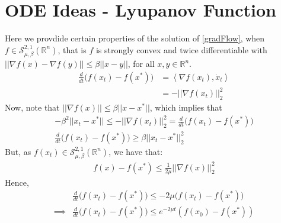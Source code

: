 \section{ODE Ideas - Lyupanov Function}
Here we provdide certain properties of the solution of \eqref{gradFlow}, when $f \in \mathcal{S}^{2,1}_{\mu,\beta}(\mathbb{R}^n)$, that is $f$ is strongly convex and twice differentiable with $|| \nabla f(x) - \nabla f(y) || \leq \beta ||x - y||$, for all $x,y \in \mathbb{R}^n$.
\begin{equation}
\begin{aligned}
\frac{d}{dt}\big(f(x_t) - f(x^*) \big) &= \left\langle \nabla f(x_t), \dot{x}_t \right\rangle \\
& = - ||\nabla f(x_t)||_2^2
\end{aligned}
\end{equation}
Now, note that $|| \nabla f(x) || \leq \beta || x - x^* ||$, which implies that
\begin{equation}
\begin{aligned}
- \beta^2 || x_t - x^* || \leq -||\nabla f(x_t)||_2^2 = \frac{d}{dt}\big(f(x_t) -f(x^*)\big) \\
\frac{d}{dt} \big(f(x_t) - f(x^*) \big) \geq \beta || x_t - x^* ||_2^2
\end{aligned}
\end{equation}
But, as $f(x_t)\in \mathcal{S}^{2,1}_{\mu,\beta}(\mathbb{R}^n)$, we have that:
\begin{equation}
\begin{aligned}
f(x) - f(x^*) \leq \frac{1}{2\mu}|| \nabla f(x)||_2^2
\end{aligned}
\end{equation}
Hence,
\begin{equation}
\begin{aligned}
& \frac{d}{dt} \big(f(x_t) - f(x^*) \big) \leq -2\mu \big(f(x_t) - f(x^*)\big) \\
\implies & \frac{d}{dt} \big(f(x_t) - f(x^*) \big) \leq e^{-2\mu t}(f(x_0) - f(x^*))
\end{aligned}
\end{equation}
